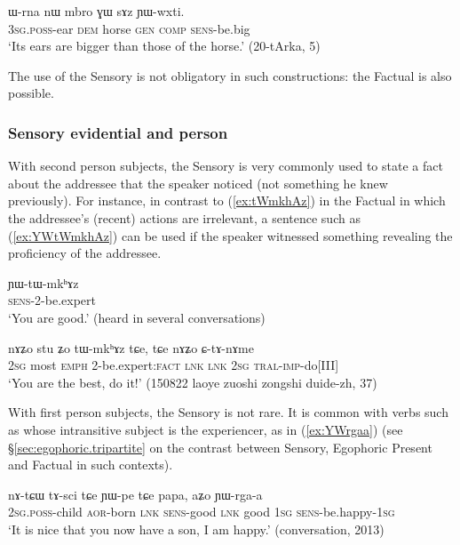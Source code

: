 \begin{exe}
\ex \label{ex:sAz.YWwxti}
\gll ɯ-rna nɯ mbro ɣɯ sɤz ɲɯ-wxti. \\
\textsc{3sg}.\textsc{poss}-ear \textsc{dem} horse \textsc{gen} \textsc{comp} \textsc{sens}-be.big \\
\glt `Its ears are bigger than those of the horse.'  (20-tArka, 5)
\end{exe}

The use of the Sensory is not obligatory in such constructions: the Factual is also possible. 

\subsubsection{Sensory evidential and person} \label{sec:sensory.person}
With second person subjects, the Sensory is very commonly used to state a fact about the addressee that the speaker noticed (not something he knew previously). For instance, in contrast to (\ref{ex:tWmkhAz}) in the Factual in which the addressee's (recent) actions are irrelevant, a sentence such as (\ref{ex:YWtWmkhAz}) can be used if the speaker witnessed something revealing the proficiency of the addressee.

\begin{exe}
\ex \label{ex:YWtWmkhAz}
\gll  ɲɯ-tɯ-mkʰɤz \\
\textsc{sens}-2-be.expert \\
\glt `You are good.' (heard in several conversations)
\end{exe}

\begin{exe}
\ex \label{ex:tWmkhAz}
\gll nɤʑo stu ʑo tɯ-mkʰɤz tɕe, tɕe nɤʑo ɕ-tɤ-nɤme \\
\textsc{2sg} most \textsc{emph} 2-be.expert:\textsc{fact}   \textsc{lnk} \textsc{lnk} \textsc{2sg} \textsc{tral}-\textsc{imp}-do[III] \\
\glt `You are the best, do it!' (150822 laoye zuoshi zongshi duide-zh, 37)
\end{exe}


With first person subjects, the Sensory is not rare. It is common with verbs such as  whose intransitive subject is the experiencer, as in (\ref{ex:YWrgaa}) (see §\ref{sec:egophoric.tripartite} on the contrast between Sensory, Egophoric Present and Factual in such contexts).

\begin{exe}
\ex \label{ex:YWrgaa}
\gll nɤ-tɕɯ tɤ-sci tɕe ɲɯ-pe tɕe papa, aʑo ɲɯ-rga-a\\
 \textsc{2sg}.\textsc{poss}-child \textsc{aor}-born \textsc{lnk} \textsc{sens}-good \textsc{lnk} good  \textsc{1sg} \textsc{sens}-be.happy-\textsc{1sg}\\
\glt `It is nice that you now have a son, I am happy.' (conversation, 2013)
\end{exe}

